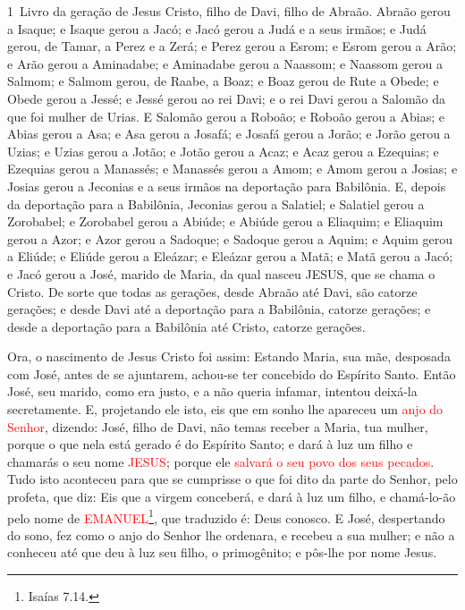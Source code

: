 \lettrine{1}\ Livro da geração de Jesus Cristo, filho de Davi,
filho de Abraão. Abraão gerou a Isaque; e Isaque gerou a Jacó; e
Jacó gerou a Judá e a seus irmãos; e Judá gerou, de Tamar, a
Perez e a Zerá; e Perez gerou a Esrom; e Esrom gerou a Arão; e
Arão gerou a Aminadabe; e Aminadabe gerou a Naassom; e Naassom gerou
a Salmom; e Salmom gerou, de Raabe, a Boaz; e Boaz gerou de Rute
a Obede; e Obede gerou a Jessé; e Jessé gerou ao rei Davi; e o
rei Davi gerou a Salomão da que foi mulher de Urias. E Salomão
gerou a Roboão; e Roboão gerou a Abias; e Abias gerou a Asa; e
Asa gerou a Josafá; e Josafá gerou a Jorão; e Jorão gerou a Uzias;
e Uzias gerou a Jotão; e Jotão gerou a Acaz; e Acaz gerou a
Ezequias; e Ezequias gerou a Manassés; e Manassés gerou a
Amom; e Amom gerou a Josias; e Josias gerou a Jeconias e a
seus irmãos na deportação para Babilônia. E, depois da
deportação para a Babilônia, Jeconias gerou a Salatiel; e Salatiel
gerou a Zorobabel; e Zorobabel gerou a Abiúde; e Abiúde gerou
a Eliaquim; e Eliaquim gerou a Azor; e Azor gerou a Sadoque;
e Sadoque gerou a Aquim; e Aquim gerou a Eliúde; e Eliúde
gerou a Eleázar; e Eleázar gerou a Matã; e Matã gerou a Jacó;
e Jacó gerou a José, marido de Maria, da qual nasceu JESUS,
que se chama o Cristo. De sorte que todas as gerações, desde
Abraão até Davi, são catorze gerações; e desde Davi até a deportação
para a Babilônia, catorze gerações; e desde a deportação para a
Babilônia até Cristo, catorze gerações.

Ora, o nascimento de Jesus Cristo foi assim: Estando Maria, sua
mãe, desposada com José, antes de se ajuntarem, achou-se ter
concebido do Espírito Santo. Então José, seu marido, como era
justo, e a não queria infamar, intentou deixá-la secretamente.
E, projetando ele isto, eis que em sonho lhe apareceu um
\textcolor{red}{anjo do Senhor}, dizendo: José, filho de Davi, não temas
receber a Maria, tua mulher, porque o que nela está gerado é do
Espírito Santo; e dará à luz um filho e chamarás o seu nome
\textcolor{red}{JESUS}; porque ele \textcolor{red}{salvará o seu povo dos seus
pecados}. Tudo isto aconteceu para que se cumprisse o que foi
dito da parte do Senhor, pelo profeta, que diz: Eis que a
virgem conceberá, e dará à luz um filho, e chamá-lo-ão pelo nome de
\textcolor{red}{EMANUEL}\footnote{Isaías 7.14.}, que traduzido é: Deus
conosco. E José, despertando do sono, fez como o anjo do
Senhor lhe ordenara, e recebeu a sua mulher; e não a conheceu
até que deu à luz seu filho, o primogênito; e pôs-lhe por nome
Jesus.

